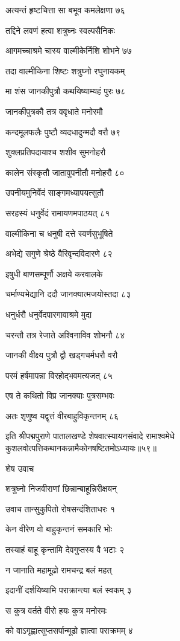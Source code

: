 अत्यन्तं हृष्टचित्ता सा बभूव कमलेक्षणा ७६

तद्दिने लवणं हत्वा शत्रुघ्नः स्वल्पसैनिकः

आगमच्चाश्रमे चास्य वाल्मीकेर्निशि शोभने ७७

तदा वाल्मीकिना शिष्टः शत्रुघ्नो रघुनायकम्

मा शंस जानकीपुत्रौ कथयिष्याम्यहं पुरः ७८

जानकीपुत्रकौ तत्र ववृधाते मनोरमौ

कन्दमूलफलैः पुष्टौ व्यदधादुन्मदौ वरौ ७९

शुक्लप्रतिपदायाश्च शशीव सुमनोहरौ

कालेन संस्कृतौ जातावुपनीतौ मनोहरौ ८०

उपनीयमुनिर्वेदं साङ्गमध्यापयत्सुतौ

सरहस्यं धनुर्वेदं रामायणमपाठयत् ८१

वाल्मीकिना च धनुषी दत्ते स्वर्णसुभूषिते

अभेद्ये सगुणे श्रेष्ठे वैरिवृन्दविदारणे ८२

इषुधी बाणसम्पूर्णौ अक्षये करवालके

चर्माण्यभेद्यानि ददौ जानक्यात्मजयोस्तदा ८३

धनुर्धरौ धनुर्वेदपारगावाश्रमे मुदा

चरन्तौ तत्र रेजाते अश्विनाविव शोभनौ ८४

जानकी वीक्ष्य पुत्रौ द्वौ खड्गचर्मधरौ वरौ

परमं हर्षमापन्ना विरहोद्भवमत्यजत् ८५

एष ते कथितो विप्र जानक्याः पुत्रसम्भवः

अतः शृणुष्व यद्वृत्तं वीरबाहुविकृन्तनम् ८६

इति श्रीपद्मपुराणे पातालखण्डे शेषवात्स्यायनसंवादे रामाश्वमेधे कुशलवोत्पत्तिकथानकन्नामैकोनषष्टितमोऽध्यायः॥५९॥


शेष उवाच

शत्रुघ्नो निजवीराणां छिन्नान्बाहून्निरीक्षयन्

उवाच तान्सुकुपितो रोषसन्दंशिताधरः १

केन वीरेण वो बाहुकृन्तनं समकारि भोः

तस्याहं बाहू कृन्तामि देवगुप्तस्य वै भटाः २

न जानाति महामूढो रामचन्द्र बलं महत्

इदानीं दर्शयिष्यामि पराक्रान्त्या बलं स्वकम् ३

स कुत्र वर्तते वीरो हयः कुत्र मनोरमः

को वाऽगृह्णात्सुप्तसर्पान्मूढो ज्ञात्वा पराक्रमम् ४

